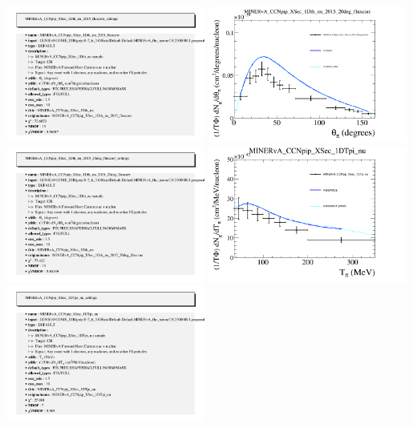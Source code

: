 \documentclass{article}
\begin{document}
\includegraphics[width=0.49\textwidth]{figures/nuisance_MINERvA_CCNpip_XSec_1Dth_nu_2015_fluxcorr_info.png}
\centering
\includegraphics[width=0.49\textwidth]{figures/nuisance_MINERvA_CCNpip_XSec_1Dth_nu_2015_20deg_fluxcorr_comp.png}
\includegraphics[width=0.49\textwidth]{figures/nuisance_MINERvA_CCNpip_XSec_1Dth_nu_2015_20deg_fluxcorr_info.png}
\centering
\includegraphics[width=0.49\textwidth]{figures/nuisance_MINERvA_CCNpip_XSec_1DTpi_nu_comp.png}
\includegraphics[width=0.49\textwidth]{figures/nuisance_MINERvA_CCNpip_XSec_1DTpi_nu_info.png}
\end{document}
